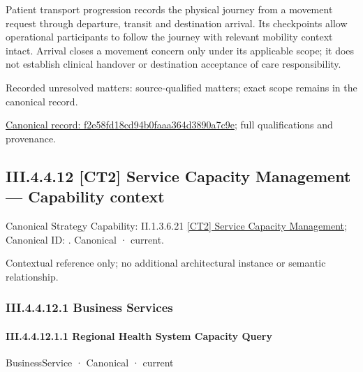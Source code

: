 Patient transport progression records the physical journey from a movement request through departure, transit and destination arrival. Its checkpoints allow operational participants to follow the journey with relevant mobility context intact. Arrival closes a movement concern only under its applicable scope; it does not establish clinical handover or destination acceptance of care responsibility.


{\small Recorded unresolved matters: source-qualified matters; exact scope remains in the canonical record.}\par
{\footnotesize \href{../../../../../../../continuum/business/business-process/f2e58fd18cd94b0faaa364d3890a7c9e.md}{Canonical record: f2e58fd18cd94b0faaa364d3890a7c9e}; full qualifications and provenance.}\par
\subsection*{III.4.4.12 [CT2] Service Capacity Management — Capability context}
\label{navigation:III.4.4.12}

{\small Canonical Strategy Capability: II.1.3.6.21 \hyperref[element:d86105bf9c86445394088f65c895d37f]{[CT2] Service Capacity Management}; Canonical ID: \texttt{}. Canonical · current.}\par
Contextual reference only; no additional architectural instance or semantic relationship.\par
\subsubsection*{III.4.4.12.1 Business Services}
\label{navigation:III.4.4.12.1}

\paragraph*{III.4.4.12.1.1 Regional Health System Capacity Query}
\label{navigation:III.4.4.12.1.1}

\label{element:ecbb1944572d44dbba55aaf565559d13}
{\small BusinessService · Canonical · current}\par

